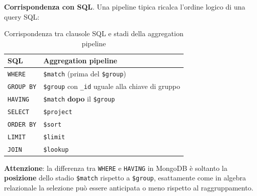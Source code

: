 \documentclass[a4paper,twoside]{article}
\begin{document}
\vspace{1em}
\noindent
\textbf{Corrispondenza con SQL}. Una pipeline tipica ricalca l'ordine logico di una query
SQL:
\begin{table}[H]
  \centering
  \small
  \begin{tabular}{@{}ll@{}}
    \toprule
    \textbf{SQL} & \textbf{Aggregation pipeline} \\
    \midrule
    \texttt{WHERE}    & \texttt{\$match} (prima del \texttt{\$group}) \\
    \texttt{GROUP BY} & \texttt{\$group} con \texttt{\_id} uguale alla chiave di gruppo \\
    \texttt{HAVING}   & \texttt{\$match} \textbf{dopo} il \texttt{\$group} \\
    \texttt{SELECT}   & \texttt{\$project} \\
    \texttt{ORDER BY} & \texttt{\$sort} \\
    \texttt{LIMIT}    & \texttt{\$limit} \\
    \texttt{JOIN}     & \texttt{\$lookup} \\
    \bottomrule
  \end{tabular}
  \caption{Corrispondenza tra clausole SQL e stadi della aggregation pipeline}
\end{table}

\noindent
\textbf{Attenzione}: la differenza tra \texttt{WHERE} e \texttt{HAVING} in MongoDB è
soltanto la \textbf{posizione} dello stadio \texttt{\$match} rispetto a
\texttt{\$group}, esattamente come in algebra relazionale la selezione può essere
anticipata o meno rispetto al raggruppamento.
\end{document}
